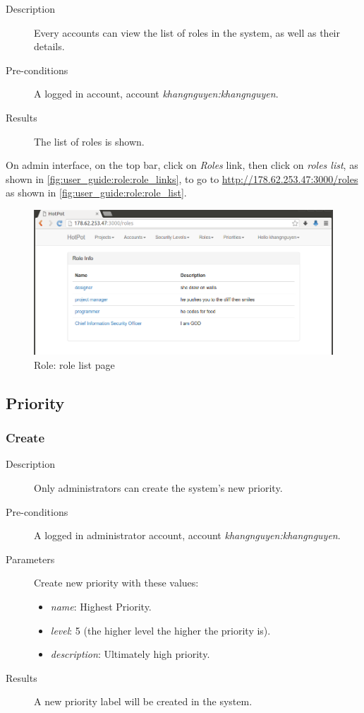 \begin{description}
\item[Description] Every accounts can view the list of roles in the system, as well as their details.
\item[Pre-conditions] A logged in account, \eg account \emph{khangnguyen:khangnguyen}.
\item[Results] The list of roles is shown.
\end{description}

On admin interface, on the top bar, click on \emph{Roles} link, then click on \emph{roles list}, as shown in \autoref{fig:user_guide:role:role_links}, 
to go to \href{http://178.62.253.47:3000/roles}{http://178.62.253.47:3000/roles} as shown in \autoref{fig:user_guide:role:role_list}.

\begin{figure}[bth]
\myfloatalign
\includegraphics[width=1.0\linewidth]{gfx/chapter_5/role/role_list}
\caption[Role: role list page]{Role: role list page}
\label{fig:user_guide:role:role_list}
\end{figure}

\subsection{Priority}
\label{ch:result:user_guide:priority}
\subsubsection{Create}
\label{ch:result:user_guide:priority:create}

\begin{description}
\item[Description] Only administrators can create the system's new priority.
\item[Pre-conditions] A logged in administrator account, \eg account \emph{khangnguyen:khangnguyen}.
\item[Parameters] Create new priority with these values:
\begin{itemize}
\item \emph{name}: Highest Priority.
\item \emph{level}: 5 (the higher level the higher the priority is).
\item \emph{description}: Ultimately high priority.
\end{itemize}
\item[Results] A new priority label will be created in the system.
\end{description}

